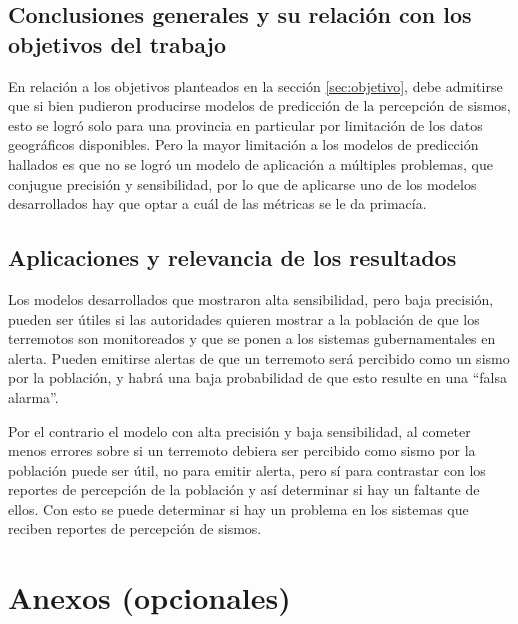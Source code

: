 \documentclass[a4paper]{report}
\begin{document}
\section{Conclusiones generales y su relación con los objetivos del trabajo}
En relación a los objetivos planteados en la sección \ref{sec:objetivo}, debe admitirse que si bien pudieron producirse modelos de predicción de la percepción de sismos, esto se logró solo para una provincia en particular por limitación de los datos geográficos disponibles.
Pero la mayor limitación a los modelos de predicción hallados es que no se logró un modelo de aplicación a múltiples problemas, que conjugue precisión y sensibilidad, por lo que de aplicarse uno de los modelos desarrollados hay que optar a cuál de las métricas se le da primacía. 



\section{Aplicaciones y relevancia de los resultados}
Los modelos desarrollados que mostraron alta sensibilidad, pero baja precisión, pueden ser útiles si las autoridades quieren mostrar a la población de que los terremotos son monitoreados y que se ponen a los sistemas gubernamentales en alerta.
Pueden emitirse alertas de que un terremoto será percibido como un sismo por la población, y habrá una baja probabilidad de que esto resulte en una ``falsa alarma''.

Por el contrario el modelo con alta precisión y baja sensibilidad, al cometer menos errores sobre si un terremoto debiera ser percibido como sismo por la población puede ser útil, no para emitir alerta, pero sí para contrastar con los reportes de percepción de la población y así determinar si hay un faltante de ellos.
Con esto se puede determinar si hay un problema en los sistemas que reciben reportes de percepción de sismos.



\printbibliography[heading=bibintoc] %



\chapter*{Anexos (opcionales)}
\end{document}

